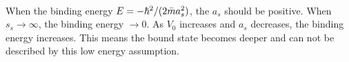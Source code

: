 \paragraph{}
When the binding energy $E = -\hbar^{2}/(2\Bar{m} a_s^2)$, the $a_s$ should be positive. When $s_s \to \infty$, the binding energy $\to 0$. As $V_0$ increases and $a_s$ decreases, the binding energy increases. This means the bound state becomes deeper and can not be described by this low energy assumption.








